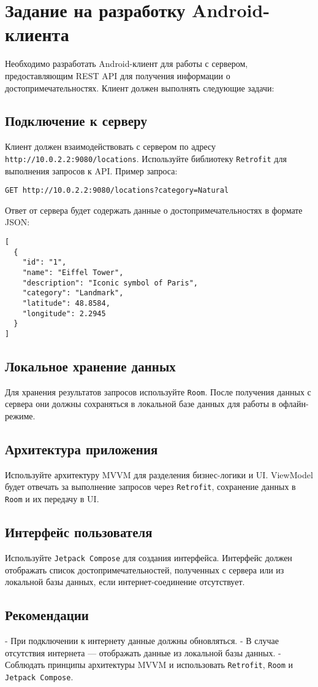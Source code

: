 \section{Задание на разработку Android-клиента}

Необходимо разработать Android-клиент для работы с сервером, предоставляющим REST API для получения информации о достопримечательностях. Клиент должен выполнять следующие задачи:

\subsection{Подключение к серверу}
Клиент должен взаимодействовать с сервером по адресу \texttt{http://10.0.2.2:9080/locations}. Используйте библиотеку \texttt{Retrofit} для выполнения запросов к API. Пример запроса:

\begin{verbatim}
GET http://10.0.2.2:9080/locations?category=Natural
\end{verbatim}

Ответ от сервера будет содержать данные о достопримечательностях в формате JSON:

\begin{verbatim}
[
  {
    "id": "1",
    "name": "Eiffel Tower",
    "description": "Iconic symbol of Paris",
    "category": "Landmark",
    "latitude": 48.8584,
    "longitude": 2.2945
  }
]
\end{verbatim}

\subsection{Локальное хранение данных}
Для хранения результатов запросов используйте \texttt{Room}. После получения данных с сервера они должны сохраняться в локальной базе данных для работы в офлайн-режиме.

\subsection{Архитектура приложения}
Используйте архитектуру MVVM для разделения бизнес-логики и UI. ViewModel будет отвечать за выполнение запросов через \texttt{Retrofit}, сохранение данных в \texttt{Room} и их передачу в UI.

\subsection{Интерфейс пользователя}
Используйте \texttt{Jetpack Compose} для создания интерфейса. Интерфейс должен отображать список достопримечательностей, полученных с сервера или из локальной базы данных, если интернет-соединение отсутствует.

\subsection{Рекомендации}
- При подключении к интернету данные должны обновляться.
- В случае отсутствия интернета — отображать данные из локальной базы данных.
- Соблюдать принципы архитектуры MVVM и использовать \texttt{Retrofit}, \texttt{Room} и \texttt{Jetpack Compose}.
